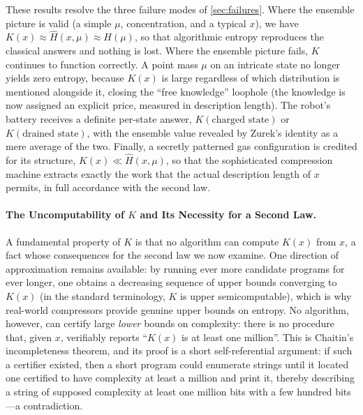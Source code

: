 \documentclass[11pt]{article}
\begin{document}
These results resolve the three failure modes of \cref{sec:failures}. Where the ensemble picture is valid (a simple $\mu$, concentration, and a typical $x$), we have $K(x) \approx \hat H(x,\mu) \approx H(\mu)$, so that algorithmic entropy reproduces the classical answers and nothing is lost. Where the ensemble picture fails, $K$ continues to function correctly. A point mass $\mu$ on an intricate state no longer yields zero entropy, because $K(x)$ is large regardless of which distribution is mentioned alongside it, closing the ``free knowledge'' loophole (the knowledge is now assigned an explicit price, measured in description length). The robot's battery receives a definite per-state answer, $K(\text{charged state})$ or $K(\text{drained state})$, with the ensemble value revealed by Zurek's identity as a mere average of the two. Finally, a secretly patterned gas configuration is credited for its structure, $K(x) \ll \hat H(x,\mu)$, so that the sophisticated compression machine extracts exactly the work that the actual description length of $x$ permits, in full accordance with the second law.

\paragraph{The Uncomputability of $K$ and Its Necessity for a Second Law.} A fundamental property of $K$ is that no algorithm can compute $K(x)$ from $x$, a fact whose consequences for the second law we now examine. One direction of approximation remains available: by running ever more candidate programs for ever longer, one obtains a decreasing sequence of upper bounds converging to $K(x)$ (in the standard terminology, $K$ is upper semicomputable), which is why real-world compressors provide genuine upper bounds on entropy. No algorithm, however, can certify large \emph{lower} bounds on complexity: there is no procedure that, given $x$, verifiably reports ``$K(x)$ is at least one million''. This is Chaitin's incompleteness theorem, and its proof is a short self-referential argument: if such a certifier existed, then a short program could enumerate strings until it located one certified to have complexity at least a million and print it, thereby describing a string of supposed complexity at least one million bits with a few hundred bits---a contradiction.
\end{document}
